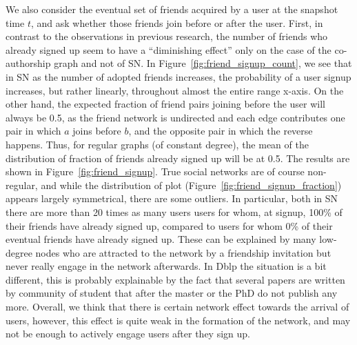 \documentclass[phd,tocprelim]{cornell}
\begin{document}
We also consider the eventual set of friends acquired by a user at the snapshot time $t$, and
ask whether those friends join before or after the user.  First, in contrast to the observations in previous research\cite{Backstrom:2006}, the number of friends who already signed up seem to have a ``diminishing effect'' only on the case of the co-authorship graph and not of SN. In Figure~\ref{fig:friend_signup_count}, we see that in SN as the number of adopted friends increases, the probability of a user signup increases, but rather linearly, throughout almost the entire range x-axis. On the other hand, the expected
fraction of friend pairs joining before the user will always be 0.5, as the friend network is undirected and each edge contributes one pair in
which $a$ joins before $b$, and the opposite pair in which the reverse
happens.  Thus, for regular graphs (of constant degree), the mean of
the distribution of fraction of friends already signed up will be at
0.5.  The results are shown in Figure~\ref{fig:friend_signup}.  True
social networks are of course non-regular, and while the distribution
of plot (Figure~\ref{fig:friend_signup_fraction}) appears largely symmetrical, there are some outliers.  In particular, both in SN there are more than 20 times as many users users for whom, at
signup, 100\% of their friends have already signed up, compared to
users for whom 0\% of their eventual friends have already signed up. These can be explained by many low-degree nodes who are attracted to the network by a friendship invitation but never really engage in the network afterwards. In Dblp the situation is a bit different, this is probably explainable by the fact that several papers are written by community of student that after the master or the PhD do not publish any more. Overall, we think that there is certain network effect towards the arrival of users, however, this effect is quite weak in the formation of the network, and may not be enough to actively engage users after they sign up.


\end{document}
